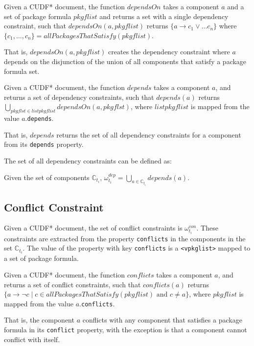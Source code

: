 \begin{defs}
Given a CUDF* document, the function $dependsOn$ takes a component $a$ and a set of package formula $pkgflist$ and returns a set with a single dependency constraint,
such that $dependsOn(a,pkgflist)$ returns $\{a \rightarrow c_1 \vee \ldots c_n\}$ where  $\{c_1,\ldots,c_n\} = allPackagesThatSatisfy(pkgflist)$.
\end{defs}
That is, $dependsOn(a,pkgflist)$ creates the dependency  constraint where $a$ depends on the disjunction of the union of all components that satisfy a package formula set. 

\begin{defs}
Given a CUDF* document, the function $depends$ takes a component $a$, and returns a set of dependency constraints,
such that $depends(a)$ returns $\bigcup \limits_{pkgflst \in listpkgflist} dependsOn(a,pkgflst)$, where $listpkgflist$ is mapped from the value $a$.\texttt{depends}.
\end{defs}
That is, $depends$ returns the set of all dependency constraints for a component from its \verb+depends+ property.

The set of all dependency constraints can be defined as:
\begin{defs}
Given the set of components $\mathbb{C}_{t_i}$, $\omega_{t_i}^{dep} = \bigcup \limits_{a \in \mathbb{C}_{t_i}} depends(a)$.
\end{defs}

\subsection{Conflict Constraint}
Given a CUDF* document, the set of conflict constraints is $\omega_{t_i}^{con}$.
These constraints are extracted from the property \texttt{conflicts} in the components in the set $\mathbb{C}_{t_i}$.
The value of the property with key \texttt{conflicts} is a \texttt{<vpkglist>} mapped to a set of package formula.

\begin{defs}
Given a CUDF* document, the function $conflicts$ takes a component $a$, and returns a set of conflict constraints,
such that $conflicts(a)$ returns $\{a \rightarrow \neg c \mid c \in allPackagesThatSatisfy(pkgflist) \mbox { and } c \not = a \}$, where $pkgflist$ is mapped from the value $a$.\texttt{conflicts}.
\end{defs}

That is, the component $a$ conflicts with any component that satisfies a package formula in its \texttt{conflict} property,
with the exception is that a component cannot conflict with itself.

